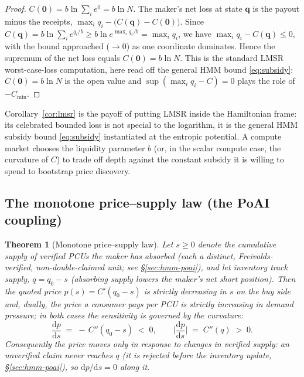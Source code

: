 \documentclass[11pt]{article}
\newtheorem{theorem}{Theorem}
\newcommand{\dd}{\mathrm{d}}
\begin{document}
\begin{proof}
$C(\bm 0)=b\ln\sum_i e^0 = b\ln N$. The maker's net loss at state $\bm q$ is the
payout minus the receipts, $\max_i q_i - \big(C(\bm q)-C(\bm 0)\big)$. Since
$C(\bm q)=b\ln\sum_i e^{q_i/b}\ge b\ln e^{\max_i q_i/b}=\max_i q_i$, we have
$\max_i q_i - C(\bm q)\le 0$, with the bound approached ($\to 0$) as one coordinate
dominates. Hence the supremum of the net loss equals $C(\bm 0)=b\ln N$. This is the
standard LMSR worst-case-loss computation, here read off the general HMM bound
\eqref{eq:subsidy}: $C(\bm 0)=b\ln N$ is the open value and $\sup(\max_i q_i - C)=0$
plays the role of $-C_{\min}$.
\end{proof}

Corollary~\ref{cor:lmsr} is the payoff of putting LMSR inside the Hamiltonian
frame: its celebrated bounded loss is not special to the logarithm, it is the
general HMM subsidy bound \eqref{eq:subsidy} instantiated at the entropic potential.
A compute market chooses the liquidity parameter $b$ (or, in the scalar compute
case, the curvature of $C$) to trade off depth against the constant subsidy it is
willing to spend to bootstrap price discovery.

\subsection{The monotone price--supply law (the PoAI coupling)}

\begin{theorem}[Monotone price--supply law]
\label{thm:monotone}
Let $s\ge 0$ denote the cumulative supply of \emph{verified} PCUs the maker has
absorbed (each a distinct, Freivalds-verified, non-double-claimed unit; see
\S\ref{sec:hmm-poai}), and let inventory track supply, $q = q_0 - s$ (absorbing
supply lowers the maker's net short position). Then the quoted price
$p(s) = C'(q_0 - s)$ is strictly decreasing in $s$ on the buy side and, dually, the
price a \emph{consumer} pays per PCU is strictly increasing in demand pressure; in
both cases the sensitivity is governed by the curvature:
\begin{equation}
\frac{\dd p}{\dd s} \;=\; -\,C''(q_0 - s) \;<\; 0,
\qquad
\Big|\frac{\dd p}{\dd s}\Big| \;=\; C''(q) \;>\; 0.
\label{eq:supplylaw}
\end{equation}
Consequently the price moves \emph{only} in response to changes in \emph{verified}
supply: an unverified claim never reaches $q$ (it is rejected before the inventory
update, \S\ref{sec:hmm-poai}), so $\dd p/\dd s = 0$ along it.
\end{theorem}
\end{document}
